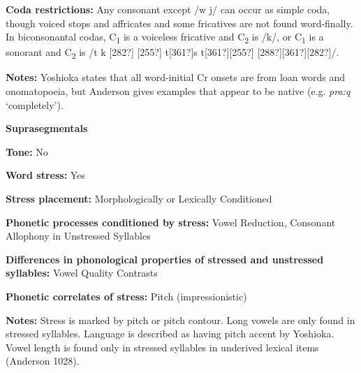 \begin{styleBody}
\textbf{Coda restrictions: }Any consonant except /w j/ can occur as simple coda, though voiced stops and affricates and some fricatives are not found word-finally. In biconsonantal codas, C\textsubscript{1} is a voiceless fricative and C\textsubscript{2} is /k/, or C\textsubscript{1} is a sonorant and C\textsubscript{2} is /t k [282?] [255?] t[361?]s t[361?][255?] [288?][361?][282?]/. 
\end{styleBody}

\begin{styleBody}
\textbf{Notes: }Yoshioka states that all word-initial Cr onsets are from loan words and onomatopoeia, but Anderson gives examples that appear to be native (e.g. \textit{pra:q} ‘completely’).
\end{styleBody}

\begin{styleBody}
\textbf{Suprasegmentals}
\end{styleBody}

\begin{styleBody}
\textbf{Tone:} No
\end{styleBody}

\begin{styleBody}
\textbf{Word stress:} Yes
\end{styleBody}

\begin{styleBody}
\textbf{Stress placement:} Morphologically or Lexically Conditioned
\end{styleBody}

\begin{styleBody}
\textbf{Phonetic processes conditioned by stress:} Vowel Reduction, Consonant Allophony in Unstressed Syllables
\end{styleBody}

\begin{styleBody}
\textbf{Differences in phonological properties of stressed and unstressed syllables:} Vowel Quality Contrasts
\end{styleBody}

\begin{styleBody}
\textbf{Phonetic correlates of stress: }Pitch (impressionistic)
\end{styleBody}

\begin{styleBody}
\textbf{Notes: }Stress is marked by pitch or pitch contour. Long vowels are only found in stressed syllables. Language is described as having pitch accent by Yoshioka. Vowel length is found only in stressed syllables in underived lexical items (Anderson 1028).
\end{styleBody}

